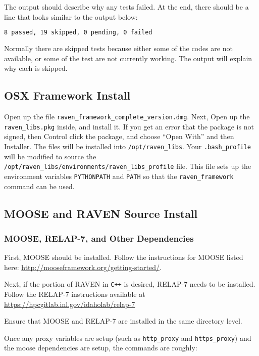 The output should describe why any tests failed.
%
At the end, there should be a line that looks similar to the output below:
\begin{lstlisting}[language=bash]
8 passed, 19 skipped, 0 pending, 0 failed
\end{lstlisting}

Normally there are skipped tests because either some of the codes are
not available, or some of the test are not currently working.  The
output will explain why each is skipped.

\subsection{OSX Framework Install}

Open up the file \texttt{raven\_framework\_complete\_version.dmg}.
%
Next, Open up the \texttt{raven\_libs.pkg} inside, and install it.  If
you get an error that the package is not signed, then Control click
the package, and choose ``Open With'' and then Installer.
%
The files will be installed into \texttt{/opt/raven\_libs}.
%
Your \texttt{.bash\_profile} will be modified to source the
\texttt{/opt/raven\_libs/environments/raven\_libs\_profile} file.
%
This file sets up the environment variables \texttt{PYTHONPATH} and
\texttt{PATH} so that the \texttt{raven\_framework} command can be used.

\subsection{MOOSE and RAVEN Source Install}

\subsubsection{MOOSE, RELAP-7, and Other Dependencies}
First, MOOSE should be installed.  Follow the instructions for MOOSE listed
here: \url{http://mooseframework.org/getting-started/}.

Next, if the portion of RAVEN in \texttt{C++} is desired, RELAP-7 needs to be installed.
%
Follow the RELAP-7 instructions available at \url{https://hpcgitlab.inl.gov/idaholab/relap-7}

Ensure that MOOSE and RELAP-7 are installed in the same directory level.

Once any proxy variables are setup (such as \texttt{http\_proxy} and
\texttt{https\_proxy}) and the moose dependencies are setup, the
commands are roughly:

